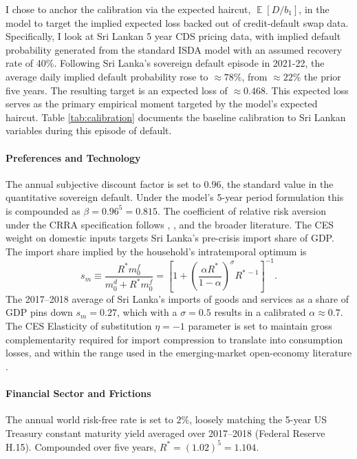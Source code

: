 \documentclass[11pt]{article}
\DeclareMathOperator{\E}{\mathbb{E}}
\theoremstyle{definition}
\theoremstyle{plain}
\theoremstyle{remark}
\begin{document}
I chose to anchor the calibration via the expected haircut, $\E\left[ {D}/{b_1}\right]$, in the model to target the implied expected loss backed out of credit-default swap data. Specifically, I look at Sri Lankan 5 year CDS pricing data, with implied default probability generated from the standard ISDA model with an assumed recovery rate of 40\%. Following Sri Lanka's sovereign default episode in 2021-22, the average daily implied default probability rose to $\approx 78\%$, from $\approx 22\%$ the prior five years. The resulting target is an expected loss of $\approx0.468$. This expected loss serves as the primary empirical moment targeted by the model's expected haircut. Table \ref{tab:calibration} documents the baseline calibration to Sri Lankan variables during this episode of default.

\paragraph{Preferences and Technology}

The annual subjective discount factor is set to $0.96$, the standard value in the quantitative sovereign default. Under the model's 5-year period formulation this is compounded as $\beta = 0.96^5 = 0.815$. The coefficient of relative risk aversion under the CRRA specification follows \citet{arellano_default_2008}, \citet{mendoza_general_2012}, and the broader \citet{eaton_debt_1981} literature. The CES weight on domestic inputs targets Sri Lanka's pre-crisis import share of GDP. The import share implied by the household's intratemporal optimum is
\[
  s_m \equiv \frac{R^* m^f_0}{m^d_0 + R^* m^f_0} 
  = \left[1 + \left(\frac{\alpha R^*}{1-\alpha}\right)^{\sigma} 
  R^{*\,-1}\right]^{-1}.
\]
The 2017--2018 average of Sri Lanka's imports of goods and services as a share of GDP pins down $s_m = 0.27$,
which with a $\sigma = 0.5$ results in a calibrated $\alpha \approx 0.7$. The CES Elasticity of substitution $\eta = -1$ parameter is set to maintain gross complementarity required for import compression to translate into consumption losses, and within the range used in the emerging-market open-economy literature \citep{mendoza_general_2012}.

\paragraph{Financial Sector and Frictions}

The annual world risk-free rate is set to $2\%$, loosely matching the 5-year US Treasury constant maturity yield 
averaged over 2017--2018 (Federal Reserve H.15). Compounded over five years, $R^* = (1.02)^5 = 1.104$.
\end{document}
